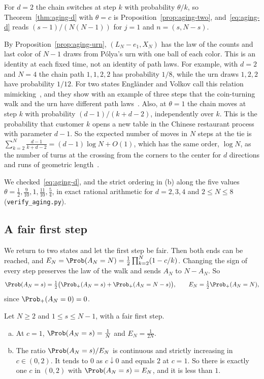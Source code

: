 \begin{remark}\label{rem:aging-d}
For $d=2$ the chain switches at step $k$ with probability $\theta/k$, so
Theorem~\ref{thm:aging-d} with $\theta=c$ is
Proposition~\ref{prop:aging-two}, and~\eqref{eq:aging-d} reads
$(s-1)/(N(N-1))$ for $j=1$ and $n=(s,N-s)$.

By Proposition~\ref{prop:aging-urn}, $(L_N-e_1,X_N)$ has the law of
the counts and last color of $N-1$ draws from P\'olya's urn with one ball of
each color. This is an identity at each fixed time, not an identity of path
laws. For example, with $d=2$ and $N=4$ the chain path $1,1,2,2$ has
probability $1/8$, while the urn draws $1,2,2$ have probability $1/12$.
For two states Engl\"ander and Volkov call this relation
mimicking~, and they show with an
example of three steps that the coin-turning walk and the urn have different
path laws~. Also, at $\theta=1$ the chain moves at
step $k$ with probability $(d-1)/(k+d-2)$, independently over $k$. This is
the probability that customer $k$ opens a new table in the Chinese restaurant
process with parameter $d-1$. So the expected number of moves in $N$ steps at
the tie is $\sum_{k=2}^N\frac{d-1}{k+d-2}=(d-1)\log N+O(1)$, which has the
same order, $\log N$, as the number of turns at the crossing from the corners
to the center for $d$ directions and runs of geometric length~\cite{paperB}.

We checked~\eqref{eq:aging-d}, and the strict ordering in (b) along the five
values $\theta=\frac12,\frac9{10},1,\frac{11}{10},\frac54$, in exact
rational arithmetic for $d=2,3,4$ and $2\le N\le8$
(\texttt{verify\_aging.py}).
\end{remark}

\subsection{A fair first step}

We return to two states and let the first step be fair. Then both ends can be
reached, and $E_N=\Prob(A_N=N)=\frac12\prod_{k=2}^N(1-c/k)$. Changing the sign
of every step preserves the law of the walk and sends $A_N$ to $N-A_N$. So
\begin{equation}\label{eq:aging-fair}
 \Prob(A_N=s)=\tfrac12\bigl(\Prob_+(A_N=s)+\Prob_+(A_N=N-s)\bigr),\qquad
 E_N=\tfrac12\Prob_+(A_N=N),
\end{equation}
since $\Prob_+(A_N=0)=0$.

\begin{proposition}\label{prop:aging-fair}
Let $N\ge2$ and $1\le s\le N-1$, with a fair first step.
\begin{enumerate}[(a)]
\item At $c=1$, $\Prob(A_N=s)=\frac1N$ and $E_N=\frac1{2N}$.
\item The ratio $\Prob(A_N=s)/E_N$ is continuous and strictly increasing in
$c\in(0,2)$. It tends to $0$ as $c\downarrow0$ and equals $2$ at $c=1$. So
there is exactly one $c$ in $(0,2)$ with $\Prob(A_N=s)=E_N$, and it is less
than $1$.
\end{enumerate}
\end{proposition}

